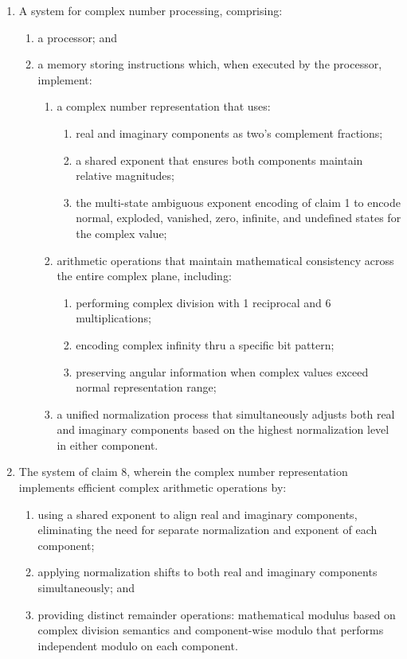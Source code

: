 \documentclass[12pt,letter]{article}
\begin{document}
\begin{enumerate}
    \item A system for complex number processing, comprising:
        \begin{enumerate}
            \item a processor; and
            \item a memory storing instructions which, when executed by the processor, implement:
                \begin{enumerate}
                    \item a complex number representation that uses:
                        \begin{enumerate}
                            \item real and imaginary components as two's complement fractions;
                            \item a shared exponent that ensures both components maintain relative magnitudes;
                            \item the multi-state ambiguous exponent encoding of claim 1 to encode normal, exploded, vanished, zero, infinite, and undefined states for the complex value;
                        \end{enumerate}
                    \item arithmetic operations that maintain mathematical consistency across the entire complex plane, including:
                        \begin{enumerate}
                            \item performing complex division with 1 reciprocal and 6 multiplications;
                            \item encoding complex infinity thru a specific bit pattern;
                            \item preserving angular information when complex values exceed normal representation range;
                        \end{enumerate}
                    \item a unified normalization process that simultaneously adjusts both real and imaginary components based on the highest normalization level in either component.
                \end{enumerate}
        \end{enumerate}

\newpage
    \item The system of claim 8, wherein the complex number representation implements efficient complex arithmetic operations by:
        \begin{enumerate}
            \item using a shared exponent to align real and imaginary components, eliminating the need for separate normalization and exponent of each component;
            \item applying normalization shifts to both real and imaginary components simultaneously; and
            \item providing distinct remainder operations: mathematical modulus based on complex division semantics and component-wise modulo that performs independent modulo on each component.
        \end{enumerate}


\end{enumerate}
\end{document}

